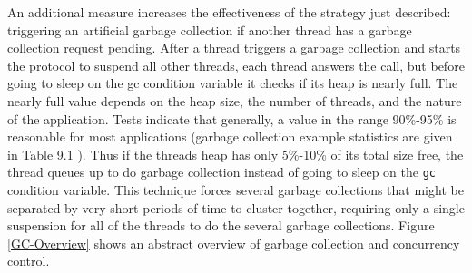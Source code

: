 An additional measure increases the effectiveness of the strategy just
described: triggering an artificial garbage collection if another thread
has a garbage collection request pending. After a thread triggers a garbage
collection and starts the protocol to suspend all other threads, each
thread answers the call, but before going to sleep on the gc condition
variable it checks if its heap is nearly full. The nearly full value
depends on the heap size, the number of threads, and the nature of the
application. Tests indicate that generally, a value in the range 90\%-95\%
is reasonable for most applications (garbage collection example statistics
are given in {\color{red} Table 9.1} ). Thus if the threads heap has only
5\%-10\% of its total size free, the thread queues up to do garbage
collection instead of going to sleep on the \texttt{gc} condition variable.
This technique forces several garbage collections that might be separated
by very short periods of time to cluster together, requiring only a single
suspension for all of the threads to do the several garbage
collections. Figure \ref{GC-Overview} shows an abstract overview of garbage
collection and concurrency control.

